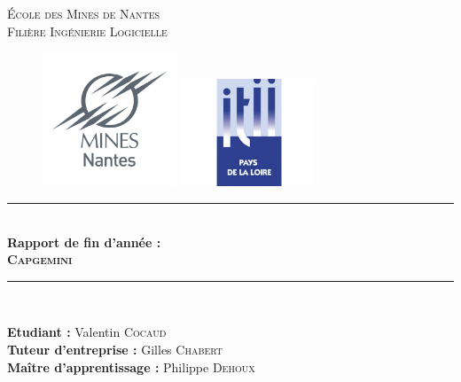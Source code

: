 \documentclass[twoside, 12pt]{report}
\newcommand{\HRule}{\rule{\linewidth}{0.5mm}}
\begin{document}
\begin{titlepage}
  \begin{sffamily}
		\begin{center}
			\textsc{\LARGE École des Mines de Nantes\\Filière Ingénierie Logicielle}\\[2cm]
			\begin{figure}[h]
				\begin{minipage}{0.5\textwidth}
					\centering
					\includegraphics[width=4cm]{img/minesNantes.png}   
				\end{minipage}%
				\begin{minipage}{0.5\textwidth}
					\centering
					\includegraphics[width=4cm]{img/itii.jpg}  
				\end{minipage}
			\end{figure}

			\vfill
			\HRule \\[0.4cm]
				{\huge \bfseries Rapport de fin d'année :\\\textsc{Capgemini}\\[0.4cm] }
			\HRule \\[2cm]

			\vfill
			\begin{minipage}{0.8\textwidth}
				\begin{center} \large
					{\textbf{Etudiant :}} Valentin \textsc{Cocaud}\\
					{\textbf{Tuteur d'entreprise :}} Gilles \textsc{Chabert}\\
					{\textbf{Maître d'apprentissage :}} Philippe \textsc{Dehoux}\\
				\end{center}
			\end{minipage}


\end{center}
\end{sffamily}
\end{titlepage}
\end{document}
